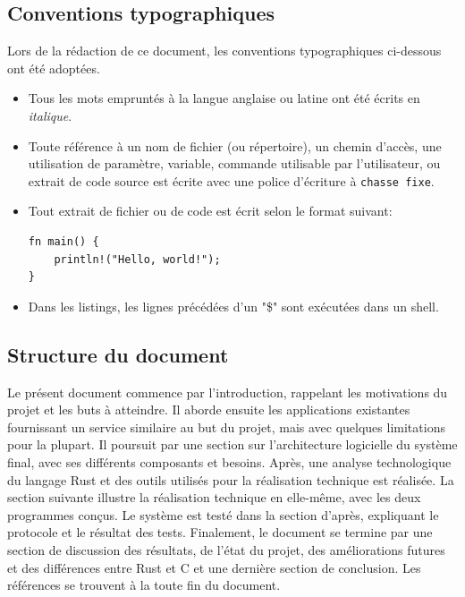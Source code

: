 \documentclass[a4paper, 12pt]{article}
\newenvironment{code}{\captionsetup{type=listing}}{}
\begin{document}
\subsection*{Conventions typographiques} %
Lors de la rédaction de ce document, les conventions typographiques ci-dessous ont
été adoptées.
\begin{itemize}[label=\textbullet]
	\item Tous les mots empruntés à la langue anglaise ou latine ont été écrits en \textit{italique}.
	\item Toute référence à un nom de fichier (ou répertoire), un chemin d'accès, une 
    utilisation de paramètre, variable, commande utilisable par l'utilisateur, ou extrait de code 
    source est écrite avec une police d'écriture à \texttt{chasse fixe}.
	\item Tout extrait de fichier ou de code est écrit selon le format suivant:
    \bigbreak
    \begin{code}
        \begin{verbatim}
fn main() {
    println!("Hello, world!");
}
        \end{verbatim}
    \end{code}
    \item Dans les listings, les lignes précédées d'un "\$" sont exécutées dans un shell.
\end{itemize}

\subsection*{Structure du document} %
Le présent document commence par l'introduction, rappelant les motivations du projet et les buts à 
atteindre. Il aborde ensuite les applications existantes fournissant un service similaire au but du 
projet, mais avec quelques limitations pour la plupart. Il poursuit par une section sur l'architecture 
logicielle du système final, avec ses différents composants et besoins. Après, une analyse technologique du 
langage Rust et des outils utilisés pour la réalisation technique est réalisée. La section suivante illustre 
la réalisation technique en elle-même, avec les deux programmes conçus. Le système est testé dans 
la section d'après, expliquant le protocole et le résultat des tests. Finalement, le document se 
termine par une section de discussion des résultats, de l'état du projet, des améliorations futures 
et des différences entre Rust et C et une dernière section de conclusion. Les références se trouvent à 
la toute fin du document.
\end{document}
